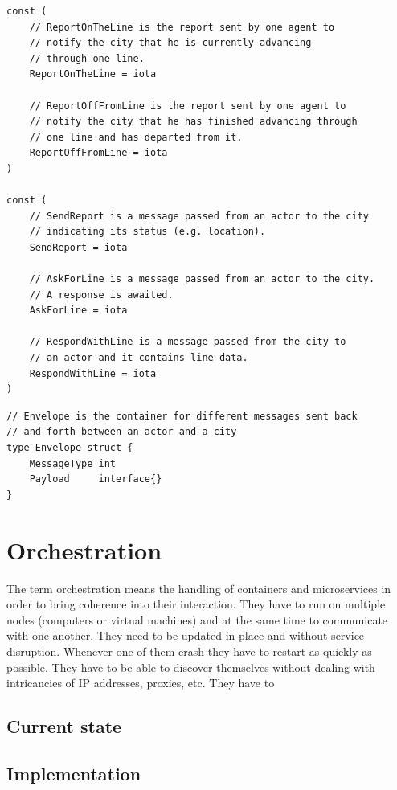\documentclass[conference]{IEEEtran}
\begin{document}
\begin{lstlisting}[caption=Go enumerations for messaging, label=lst:goactorreports]
const (   
    // ReportOnTheLine is the report sent by one agent to
    // notify the city that he is currently advancing
    // through one line.
    ReportOnTheLine = iota
    
    // ReportOffFromLine is the report sent by one agent to
    // notify the city that he has finished advancing through
    // one line and has departed from it.
    ReportOffFromLine = iota
)
    
const (
    // SendReport is a message passed from an actor to the city
    // indicating its status (e.g. location).
    SendReport = iota
    
    // AskForLine is a message passed from an actor to the city.
    // A response is awaited.
    AskForLine = iota
    
    // RespondWithLine is a message passed from the city to
    // an actor and it contains line data.
    RespondWithLine = iota
)
\end{lstlisting}

\begin{lstlisting}[caption=Go top level struct (envelope), label=lst:goenvelope]
// Envelope is the container for different messages sent back
// and forth between an actor and a city
type Envelope struct {
    MessageType int
    Payload     interface{}
}
\end{lstlisting}

\section{Orchestration}

The term orchestration means the handling of containers and microservices in order to bring coherence into their interaction. They have to run on multiple nodes (computers or virtual machines) and at the same time to communicate with one another. They need to be updated in place and without service disruption. Whenever one of them crash they have to restart as quickly as possible. They have to be able to discover themselves without dealing with intricancies of IP addresses, proxies, etc. They have to 

\subsection{Current state}

\subsection{Implementation}
\end{document}
